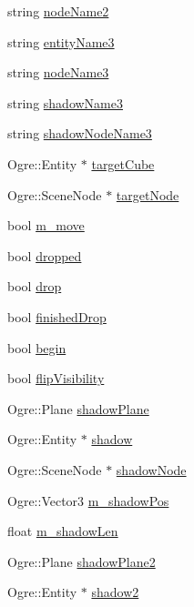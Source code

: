 \begin{DoxyCompactItemize}
string \hyperlink{class_cube_adb599c7527c0a082f07e38e4085a8ded}{node\-Name2}
\item 
string \hyperlink{class_cube_ab9ed6ed2275f2e1a67ee13aa916ba6ea}{entity\-Name3}
\item 
string \hyperlink{class_cube_aa4e261bd51d36701783bfe90015cfc37}{node\-Name3}
\item 
string \hyperlink{class_cube_a3bb63d0dffdc360db0dee096083bd98d}{shadow\-Name3}
\item 
string \hyperlink{class_cube_ac59874f591b123fc0f0d7b4c88ab9130}{shadow\-Node\-Name3}
\item 
Ogre\-::\-Entity $\ast$ \hyperlink{class_cube_a9af90d4cbb6956867599962f58144322}{target\-Cube}
\item 
Ogre\-::\-Scene\-Node $\ast$ \hyperlink{class_cube_a8ff3abf1bb201413140c23d870961ea2}{target\-Node}
\item 
bool \hyperlink{class_cube_a5e8d56fc07da94b47dd527b80d2f5b42}{m\-\_\-move}
\item 
bool \hyperlink{class_cube_a5b1c8da973a047c5cc5989c105b1f642}{dropped}
\item 
bool \hyperlink{class_cube_a07764788ed55a68115242e81efe3afaa}{drop}
\item 
bool \hyperlink{class_cube_a0031d492bef46fc3b1c7f8349af10e93}{finished\-Drop}
\item 
bool \hyperlink{class_cube_a1eb14ea30f3a4a53cf4b889d99b0436c}{begin}
\item 
bool \hyperlink{class_cube_a6d5327a45addd39b6190e3d400228842}{flip\-Visibility}
\item 
Ogre\-::\-Plane \hyperlink{class_cube_a9f4a7fe70d1017e112c5486268ccde48}{shadow\-Plane}
\item 
Ogre\-::\-Entity $\ast$ \hyperlink{class_cube_af31b1b23360a7dd9daec4239cc28b1af}{shadow}
\item 
Ogre\-::\-Scene\-Node $\ast$ \hyperlink{class_cube_a90a483946cdb6d20ae815ec9300a7dff}{shadow\-Node}
\item 
Ogre\-::\-Vector3 \hyperlink{class_cube_a5b6c34989a238006fb3df95debbb5b61}{m\-\_\-shadow\-Pos}
\item 
float \hyperlink{class_cube_abf7ae874f1da5c76795c8aa15fa8dc36}{m\-\_\-shadow\-Len}
\item 
Ogre\-::\-Plane \hyperlink{class_cube_a50238beea54f1107761f375870b504ea}{shadow\-Plane2}
\item 
Ogre\-::\-Entity $\ast$ \hyperlink{class_cube_af1df68e410cff62cbfb3b6d6d925e0cd}{shadow2}
\item 

\end{DoxyCompactItemize}
